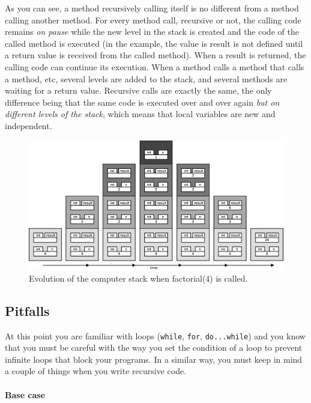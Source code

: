 As you can see, a method recursively calling itself is no different
from a method calling another method. For every method call, recursive
or not, the calling code remains \emph{on pause} while the new level
in the stack is created and the code of the called method is
executed (in the example, the value is result is not defined until a
return value is received from the called method). 
When a result is returned, the calling code can continue its
execution. When a method calls a method that calls a method, etc,
several levels are added to the stack, and several methods are waiting
for a return value. Recursive calls are exactly the same, the only
difference being that the same code is executed over and over again
\emph{but on different levels of the stack}, which means that local
variables are new and independent. 

\begin{figure}[hbtp]
  \centering
  \includegraphics[width=\textwidth]{gfx/recursive-factorial}
  \caption{Evolution of the computer stack when factorial(4) is called.}
  \label{fig:fact}
\end{figure}

\subsection{Pitfalls}
\label{sec:pitfalls}

At this point you are familiar with loops (\verb+while+, \verb+for+,
\verb+do...while+) and you know that you must be careful with the
way you set the condition of a loop to prevent infinite loops that
block your programs. In a similar way, you must keep in mind a couple
of things when you write recursive code. 

\paragraph{Base case}
\label{sec:base-case}

